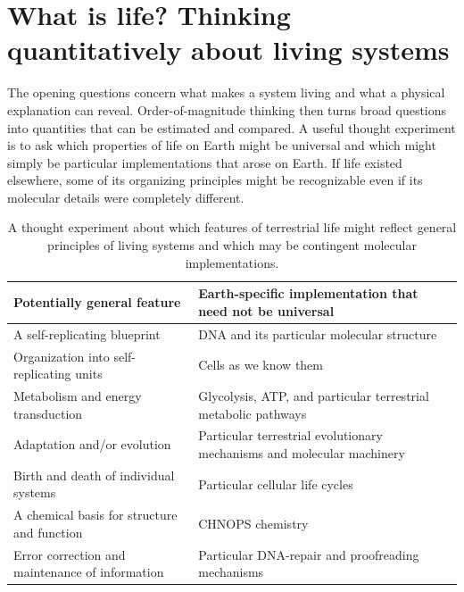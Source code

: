 \clearpage
\section{What is life? Thinking quantitatively about living systems}
\label{sec:life}
The opening questions concern what makes a system living and what a physical explanation can reveal.
Order-of-magnitude thinking then turns broad questions into quantities that can be estimated and compared.
\label{sec:life-features}
A useful thought experiment is to ask which properties of life on Earth might be universal and which might simply be particular implementations that arose on Earth.
If life existed elsewhere, some of its organizing principles might be recognizable even if its molecular details were completely different.

\begin{table}[h!]
\centering
\renewcommand{\arraystretch}{1.4}
\begin{tabularx}{0.9\textwidth}{
    |>{\raggedright\arraybackslash}X
    |>{\raggedright\arraybackslash}X|
}
\hline
\textbf{Potentially general feature} & \textbf{Earth-specific implementation that need not be universal}
\\
\hline
A self-replicating blueprint & DNA and its particular molecular structure
\\
\hline
Organization into self-replicating units & Cells as we know them
\\
\hline
Metabolism and energy transduction & Glycolysis, ATP, and particular terrestrial metabolic pathways
\\
\hline
Adaptation and/or evolution & Particular terrestrial evolutionary mechanisms and molecular machinery
\\
\hline
Birth and death of individual systems & Particular cellular life cycles
\\
\hline
A chemical basis for structure and function & CHNOPS chemistry
\\
\hline
Error correction and maintenance of information & Particular DNA-repair and proofreading mechanisms
\\
\hline
\end{tabularx}
\caption{A thought experiment about which features of terrestrial life might reflect general principles of living systems and which may be contingent molecular implementations.}
\end{table}



